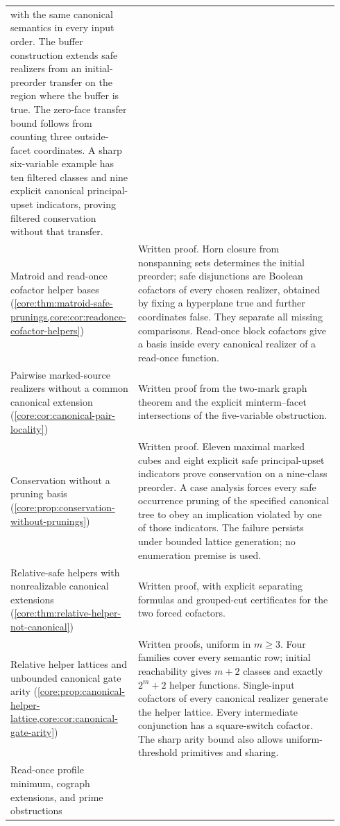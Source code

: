 {\begin{longtable}{>{\raggedright\arraybackslash}p{0.34\linewidth}>{\raggedright\arraybackslash}p{0.60\linewidth}}
with the same canonical semantics in every input order.
The buffer construction extends safe realizers from an
initial-preorder transfer on the region where the buffer is true.
The zero-face transfer bound follows from counting three outside-facet
coordinates. A sharp six-variable example has ten filtered classes and
nine explicit canonical principal-upset indicators, proving filtered
conservation without that transfer.\\
Matroid and read-once cofactor helper bases
(\cref{core:thm:matroid-safe-prunings,core:cor:readonce-cofactor-helpers})
 & Written proof. Horn closure from nonspanning sets determines the initial preorder;
safe disjunctions are Boolean cofactors of every chosen realizer,
obtained by fixing a hyperplane true and further coordinates false.
They separate all missing comparisons. Read-once block cofactors give
a basis inside every canonical realizer of a read-once function.\\
Pairwise marked-source realizers without a common canonical extension
(\cref{core:cor:canonical-pair-locality})
 & Written proof from the two-mark graph theorem and the explicit
minterm--facet intersections of the five-variable obstruction.\\
Conservation without a pruning basis (\cref{core:prop:conservation-without-prunings})
 & Written proof. Eleven maximal marked cubes and eight explicit safe
principal-upset indicators prove conservation on a nine-class preorder.
A case analysis forces every safe occurrence pruning of the specified
canonical tree to obey an implication violated by one of those indicators.
The failure persists under bounded lattice generation; no enumeration
premise is used.\\
Relative-safe helpers with nonrealizable canonical extensions
(\cref{core:thm:relative-helper-not-canonical})
 & Written proof, with explicit separating formulas and grouped-cut
certificates for the two forced cofactors.\\
Relative helper lattices and unbounded canonical gate arity
(\cref{core:prop:canonical-helper-lattice,core:cor:canonical-gate-arity})
 & Written proofs, uniform in $m\geq3$. Four families cover every semantic
row; initial reachability gives $m+2$ classes and exactly $2^m+2$ helper
functions. Single-input cofactors of every canonical realizer generate
the helper lattice. Every intermediate conjunction has a square-switch cofactor.
The sharp arity bound also allows uniform-threshold primitives and sharing.\\
Read-once profile minimum, cograph extensions, and prime obstructions

\end{longtable}}
